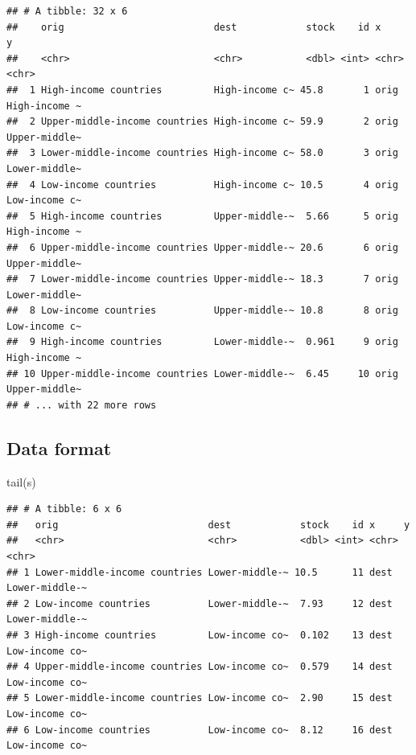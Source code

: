 \documentclass[
]{book}
\newenvironment{Shaded}{\begin{snugshade}}{\end{snugshade}}
\newcommand{\FunctionTok}[1]{\textcolor[rgb]{0.00,0.00,0.00}{#1}}
\newcommand{\NormalTok}[1]{#1}
\begin{document}
\begin{verbatim}
## # A tibble: 32 x 6
##    orig                          dest            stock    id x     y            
##    <chr>                         <chr>           <dbl> <int> <chr> <chr>        
##  1 High-income countries         High-income c~ 45.8       1 orig  High-income ~
##  2 Upper-middle-income countries High-income c~ 59.9       2 orig  Upper-middle~
##  3 Lower-middle-income countries High-income c~ 58.0       3 orig  Lower-middle~
##  4 Low-income countries          High-income c~ 10.5       4 orig  Low-income c~
##  5 High-income countries         Upper-middle-~  5.66      5 orig  High-income ~
##  6 Upper-middle-income countries Upper-middle-~ 20.6       6 orig  Upper-middle~
##  7 Lower-middle-income countries Upper-middle-~ 18.3       7 orig  Lower-middle~
##  8 Low-income countries          Upper-middle-~ 10.8       8 orig  Low-income c~
##  9 High-income countries         Lower-middle-~  0.961     9 orig  High-income ~
## 10 Upper-middle-income countries Lower-middle-~  6.45     10 orig  Upper-middle~
## # ... with 22 more rows
\end{verbatim}

\hypertarget{data-format-2}{%
\subsection{Data format}\label{data-format-2}}

\begin{Shaded}
\begin{Highlighting}[]
\FunctionTok{tail}\NormalTok{(s)}
\end{Highlighting}
\end{Shaded}

\begin{verbatim}
## # A tibble: 6 x 6
##   orig                          dest            stock    id x     y             
##   <chr>                         <chr>           <dbl> <int> <chr> <chr>         
## 1 Lower-middle-income countries Lower-middle-~ 10.5      11 dest  Lower-middle-~
## 2 Low-income countries          Lower-middle-~  7.93     12 dest  Lower-middle-~
## 3 High-income countries         Low-income co~  0.102    13 dest  Low-income co~
## 4 Upper-middle-income countries Low-income co~  0.579    14 dest  Low-income co~
## 5 Lower-middle-income countries Low-income co~  2.90     15 dest  Low-income co~
## 6 Low-income countries          Low-income co~  8.12     16 dest  Low-income co~
\end{verbatim}
\end{document}
